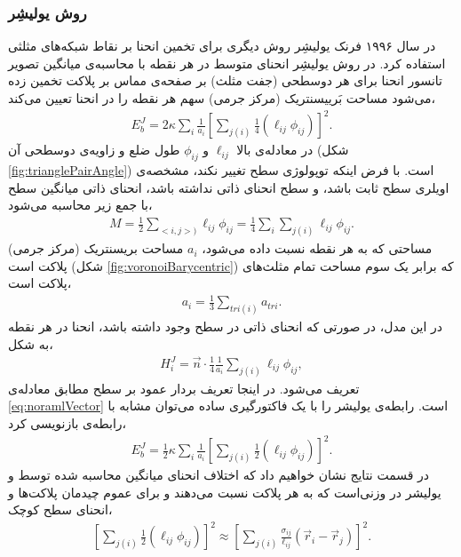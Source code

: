 \subsubsection{
روش یولیشِر
}
در سال ۱۹۹۶ فرنک یولیشِر 
\cite{Julicher1996}
روش دیگری برای تخمین انحنا بر نقاط شبکه‌های مثلثی استفاده کرد. در روش یولیشِر انحنای متوسط در هر نقطه با محاسبه‌ی  میانگین تصویر تانسور انحنا برای هر دوسطحی (جفت مثلث‌) بر صفحه‌ی مماس بر پلاکت  تخمین زده می‌شود
\cite{Ramakrishnan2011}
مساحت بَرییسنتریک
(مرکز جرمی) سهم هر نقطه را در انحنا تعیین می‌کند،
\begin{eqnarray}
E_{b}^{J}=2\kappa\sum_{i}\frac{1}{a_i}\left[\sum_{j(i)}\frac{1}{4}(\ell_{ij}\phi_{ij})\right]^2.
\label{eq:JulicherPotential}
\end{eqnarray}
در معادله‌ی بالا 
$\ell_{ij}$
و
$\phi_{ij}$
طول ضلع و زاویه‌ی دوسطحی آن (شکل
\ref{fig:trianglePairAngle})
 است. با فرض اینکه توپولوژی سطح تغییر نکند، مشخصه‌ی اویلری سطح ثابت باشد، و سطح انحنای ذاتی نداشته باشد، انحنای ذاتی میانگین سطح با جمع زیر محاسبه می‌شود، 
\begin{eqnarray}
M=\frac{1}{2}\sum_{<i,j>)}\ell_{ij}\phi_{ij} = \frac{1}{4}\sum_i\sum_{j(i)}\ell_{ij}\phi_{ij}.
\label{eq:JulicherTotalMeanCurvature}
\end{eqnarray}
مساحتی که به هر نقطه نسبت داده می‌شود،
$a_i$
مساحت بریسنتریک (مرکز جرمی) پلاکت است (شکل
\ref{fig:voronoiBarycentric})
 که برابر یک سوم مساحت تمام مثلث‌های پلاکت است، 
\begin{eqnarray}
a_i=\frac{1}{3}\sum_{tri (i)}a_{tri}.
\label{eq:BarycentricArea}
\end{eqnarray}
در این مدل، در صورتی که انحنای ذاتی در سطح وجود داشته باشد، انحنا در هر نقطه به شکل،
\begin{eqnarray}
H_i^J=\vec n\cdot\frac{1}{4}\frac{1}{a_i}\sum_{j(i)}\ell_{ij}\phi_{ij},
\label{eq:meanCurvatureDiscreteSingleVertexJulicher}
\end{eqnarray}
تعریف می‌شود. در اینجا تعریف بردار عمود بر سطح مطابق معادله‌ی
\ref{eq:noramlVector}
است. رابطه‌ی یولیشر را با یک فاکتورگیری ساده می‌توان مشابه با رابطه‌ی  بازنویسی کرد،
\begin{eqnarray}
E_{b}^{J}=\frac{1}{2}\kappa\sum_{i}\frac{1}{a_i}\left[\sum_{j(i)}\frac{1}{2}(\ell_{ij}\phi_{ij})\right]^2.
\label{eq:JulicherPotentialHalf}
\end{eqnarray}
در قسمت نتایج نشان خواهیم داد که اختلاف انحنای میانگین محاسبه شده توسط  و یولیشر در وزنی‌است که به هر پلاکت نسبت می‌دهند و برای عموم چیدمان‌ پلاکت‌ها و انحنای سطح کوچک،
\begin{eqnarray}
\left[\sum_{j(i)}\frac{1}{2}(\ell_{ij}\phi_{ij})\right]^2\approx\left[\sum_{j(i)}\frac{\sigma_{ij}}{\ell_{ij}}(\vec r_i-\vec r_j)\right]^2.
\label{eq:JulicherItzyksonNumerator}
\end{eqnarray}


